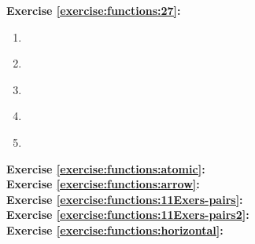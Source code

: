 \noindent\textbf{Exercise \ref{exercise:functions:27}:}\\ %
\begin{multicols}{2}
\begin{enumerate}
\item \label{FunctionsChapExers-FindAll-abc,d}
\item \label{FunctionsChapExers-FindAll-ab,cd}
\item \label{FunctionsChapExers-FindAll-a,bcd}
\item \label{FunctionsChapExers-FindAll-ab,cde}
\item 
\end{enumerate}
\end{multicols}


\noindent\textbf{Exercise \ref{exercise:functions:atomic}:}\\

\noindent\textbf{Exercise \ref{exercise:functions:arrow}:}\\

\noindent\textbf{Exercise \ref{exercise:functions:11Exers-pairs}:}\\

\noindent\textbf{Exercise \ref{exercise:functions:11Exers-pairs2}:}\\


\noindent\textbf{Exercise \ref{exercise:functions:horizontal}:}\\

